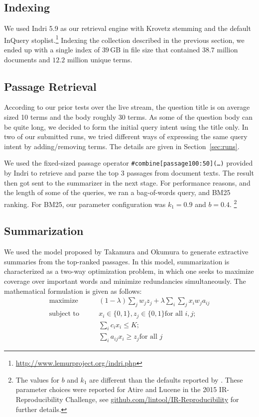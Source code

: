 \documentclass[a4paper,10pt,conference,compsocconf,final]{IEEEtran}
\newcommand\gb[1]{$#1$\,GB}
\begin{document}
{{{{\subsection{Indexing}
We used Indri 5.9 as
our retrieval engine with Krovetz stemming and the default InQuery
stoplist.\footnote{\url{http://www.lemurproject.org/indri.php}} Indexing the
collection described in the previous section, we ended up with a
single index of \gb{39} in file size that contained $38.7$ million documents
and $12.2$ million unique terms.

\subsection{Passage Retrieval}
\label{sec:passage}

According to our prior tests over the live stream, the question title is on
average sized 10 terms and the body roughly 30 terms.  As some of the question
body can be quite long, we decided to form the initial query intent using
the title only.  In two of our submitted runs, we tried different ways of
expressing the same query intent by adding/removing terms.  The details are
given in Section~\ref{sec:runs}.

We used the fixed-sized passage operator \texttt{\#combine[passage100:50](\ldots)} 
provided by Indri to retrieve and parse the top 3 passages from
document texts.  The result then got sent to the summarizer in the next stage.
For performance reasons, and the length of some of the queries, we ran a
bag-of-words query, and BM25 ranking.  For BM25, our parameter configuration
was $k_1=0.9$ and $b=0.4$.  \footnote{The values for $b$ and $k_1$ are
different than the defaults reported by {\citet{rwj+94-trec}}.  These parameter
choices were reported for Atire and Lucene in the 2015 IR-Reproducibility
Challenge, see {\url{github.com/lintool/IR-Reproducibility}} for further
details.}  

\subsection{Summarization}
\label{sec:sum}

We used the model proposed by Takamura and Okumura \cite{takamura2009text} to
generate extractive summaries from the top-ranked passages.  In this model,
summarization is characterized as a two-way optimization problem, in which one
seeks to maximize coverage over important words and minimize redundancies
simultaneously.  The mathematical formulation is given as follows:
\begin{equation}
\begin{split}
  \textrm{maximize} \qquad & (1-\lambda) \sum_{j} w_j z_j + \lambda \sum_{i}\sum_{j} x_i w_j a_{ij} \\
  \textrm{subject to} \qquad 
  & x_i \in \{0,1\}, z_j \in \{0,1\} \textrm{for all $i, j$}; \\
       & \sum_{i} c_ix_i \le K; \\
       & \sum_{i}^{} a_{ij}x_i \ge z_j \textrm{for all $j$} 
\end{split}
\end{equation}

}}}}
\end{document}
